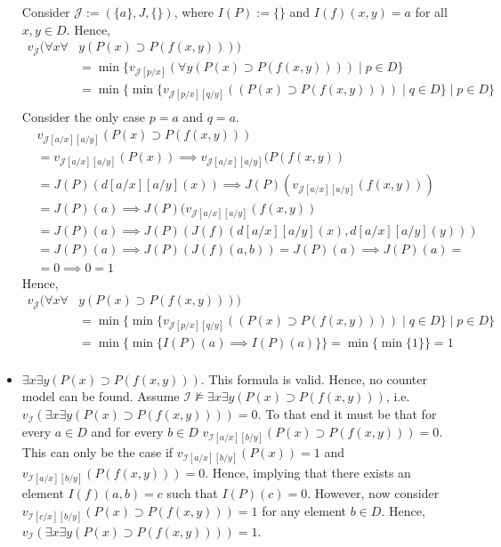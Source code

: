 \documentclass[11pt,a4paper]{article}
\begin{document}
\begin{itemize}
Consider $\mathcal{J}:=(\{a\}, J, \{\})$, where $I(P):=\{\}$ and $I(f)(x,y)=a$ for all $x,y \in D$.
Hence,
\begin{equation*}
\begin{split}
v_{\mathcal{J}}(\forall x \forall  &y (P(x) \supset P(f(x,y)))) \\
&=\min \{v_{\mathcal{J}[p/x]}( \forall  y (P(x) \supset P(f(x,y))))  \mid  p \in D\}\\
&=\min \{\min \{v_{\mathcal{J}[p/x][q/y]}((P(x) \supset P(f(x,y))))  \mid  q \in D\} \mid  p \in D\} \\
\end{split}
\end{equation*}
Consider the only case $p=a$ and $q=a$.
\begin{equation*}
\begin{split}
&v_{\mathcal{J}[a/x][a/y]}(P(x) \supset P(f(x,y)))\\ 
&=v_{\mathcal{J}[a/x][a/y]}(P(x)) \implies v_{\mathcal{J}[a/x][a/y]}(P(f(x,y)) \\
&=J(P)(d[a/x][a/y](x)) \implies J(P)(v_{\mathcal{J}[a/x][a/y]}(f(x,y))) \\
&=J(P)(a) \implies J(P)(v_{\mathcal{J}[a/x][a/y]}(f(x,y)) \\
&=J(P)(a) \implies J(P)(J(f)(d[a/x][a/y](x),d[a/x][a/y](y))) \\
&=J(P)(a) \implies J(P)(J(f)(a,b)) = J(P)(a) \implies J(P)(a) = \\
&= 0 \implies 0 = 1
\end{split}
\end{equation*}
Hence, 
\begin{equation*}
\begin{split}
v_{\mathcal{J}}(\forall x \forall  &y (P(x) \supset P(f(x,y)))) \\
&=\min \{\min \{v_{\mathcal{J}[p/x][q/y]}((P(x) \supset P(f(x,y))))  \mid  q \in D\} \mid  p \in D\} \\
&=\min \{\min \{ I(P)(a) \implies I(P)(a)\} \}=\min \{\min \{ 1\} \} = 1\\
\end{split}
\end{equation*}

\item $\exists x \exists  y (P(x) \supset P(f(x,y)))$. 
This formula is valid. Hence, no counter model can be found. Assume $\mathcal{I} \nvDash \exists x \exists  y (P(x) \supset P(f(x,y)))$, i.e. $v_{\mathcal{I}}(\exists x \exists  y (P(x) \supset P(f(x,y))))=0$. To that end it must be that for every $a \in D$ and for every $b \in D$ $v_{\mathcal{I}[a/x][b/y]}(P(x) \supset P(f(x,y)))=0$. This can only be the case if $v_{\mathcal{I}[a/x][b/y]}(P(x))=1$ and $v_{\mathcal{I}[a/x][b/y]}(P(f(x,y)))=0$. Hence, implying that there exists an element $I(f)(a,b)=c$ such that $I(P)(c)=0$. However, now consider $v_{\mathcal{I}[c/x][b/y]}(P(x) \supset P(f(x,y)))=1$ for any element $b\in D$. Hence, $v_{\mathcal{I}}(\exists x \exists  y (P(x) \supset P(f(x,y))))=1$.




\end{itemize}
\end{document}
